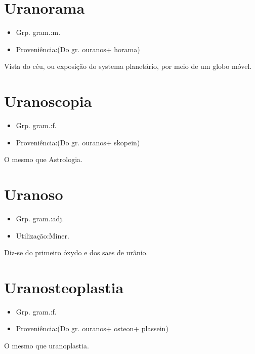 \documentclass{article}
\begin{document}
\section{Uranorama}
\begin{itemize}
\item {Grp. gram.:m.}
\end{itemize}
\begin{itemize}
\item {Proveniência:(Do gr. \textunderscore ouranos\textunderscore  + \textunderscore horama\textunderscore )}
\end{itemize}
Vista do céu, ou exposição do systema planetário, por meio de um globo móvel.
\section{Uranoscopia}
\begin{itemize}
\item {Grp. gram.:f.}
\end{itemize}
\begin{itemize}
\item {Proveniência:(Do gr. \textunderscore ouranos\textunderscore  + \textunderscore skopein\textunderscore )}
\end{itemize}
O mesmo que \textunderscore Astrologia\textunderscore .
\section{Uranoso}
\begin{itemize}
\item {Grp. gram.:adj.}
\end{itemize}
\begin{itemize}
\item {Utilização:Miner.}
\end{itemize}
Diz-se do primeiro óxydo e dos saes de urânio.
\section{Uranosteoplastia}
\begin{itemize}
\item {Grp. gram.:f.}
\end{itemize}
\begin{itemize}
\item {Proveniência:(Do gr. \textunderscore ouranos\textunderscore  + \textunderscore osteon\textunderscore  + \textunderscore plassein\textunderscore )}
\end{itemize}
O mesmo que \textunderscore uranoplastia\textunderscore .
\end{document}

